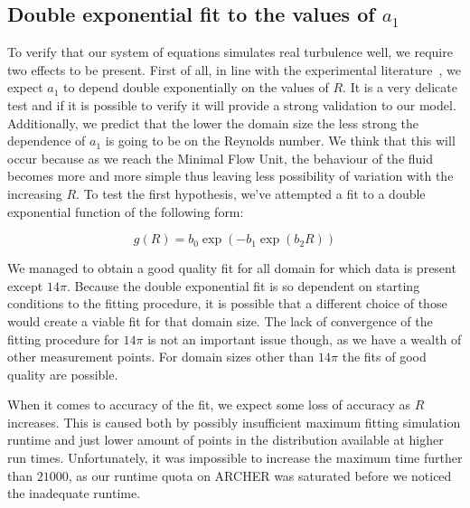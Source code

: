 \documentclass[11pt,a4paper]{article}
\begin{document}
\subsection{Double exponential fit to the values of $a_1$}
To verify that our system of equations simulates real turbulence well, we require two effects to be present.
First of all, in line with the experimental literature~\cite{Hof06}, we expect $a_1$ to depend double exponentially on the values of $R$.
It is a very delicate test and if it is possible to verify it will provide a strong validation to our model.
Additionally, we predict that the lower the domain size the less strong the dependence of $a_1$ is going to be on the Reynolds number.
We think that this will occur because as we reach the Minimal Flow Unit, the behaviour of the fluid becomes more and more simple thus leaving less possibility of variation with the increasing $R$.
To test the first hypothesis, we've attempted a fit to a double exponential function of the following form:

\begin{equation}\label{eq:g}
 g(R) = b_0\exp(-b_1\exp(b_2R))
 \end{equation}

We managed to obtain a good quality fit for all domain for which data is present except $14\pi$.
Because the double exponential fit is so dependent on starting conditions to the fitting procedure, it is possible that a different choice of those would create a viable fit for that domain size.
The lack of convergence of the fitting procedure for $14\pi$ is not an important issue though, as we have a wealth of other measurement points.
For domain sizes other than $14\pi$ the fits of good quality are possible.

When it comes to accuracy of the fit, we expect some loss of accuracy as $R$ increases.
This is caused both by possibly insufficient maximum fitting simulation runtime and just lower amount of points in the distribution available at higher run times.
Unfortunately, it was impossible to increase the maximum time further than $21000$, as our runtime quota on ARCHER was saturated before we noticed the inadequate runtime.
\end{document}
